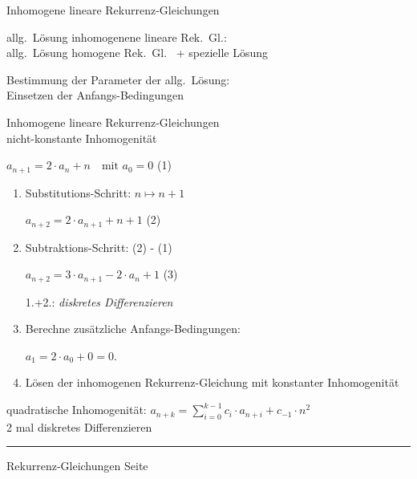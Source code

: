 \documentclass{slides}
\newcounter{mypage}
\begin{document}
\begin{slide}{}
 \begin{center}
  Inhomogene lineare Rekurrenz-Gleichungen 
\end{center}

\footnotesize
allg.~L\"osung inhomogenene lineare Rek.~Gl.: \\[0.3cm]
\hspace*{1.3cm}
allg.~L\"osung homogene Rek.~Gl.~ + spezielle L\"osung

Bestimmung der Parameter der allg.~L\"osung: 
\\[0.3cm]
\hspace*{1.3cm}
Einsetzen der Anfangs-Bedingungen

\normalsize
 \begin{center}
  Inhomogene lineare Rekurrenz-Gleichungen \\
  nicht-konstante Inhomogenit\"at
\end{center}
\footnotesize

\hspace*{1.3cm}
$\displaystyle a_{n+1} = 2 \cdot a_n + n \quad \mbox{mit $a_0 = 0$}$
\hspace*{\fill} (1)
\begin{enumerate}
\item Substitutions-Schritt: $n \mapsto n + 1$

      $\displaystyle a_{n+2} = 2 \cdot a_{n+1} + n + 1$
      \hspace*{\fill} (2)
\item Subtraktions-Schritt: (2) - (1)

      $a_{n+2} = 3 \cdot a_{n+1} - 2 \cdot a_n + 1$ 
      \hspace*{\fill} (3)

      1.+2.: \emph{diskretes Differenzieren}
\item Berechne zus\"atzliche Anfangs-Bedingungen: 

      $a_1 = 2 \cdot a_0 + 0 = 0$.
\item L\"osen der inhomogenen Rekurrenz-Gleichung mit konstanter Inhomogenit\"at
\end{enumerate}
quadratische Inhomogenit\"at: 
$a_{n+k} = \sum\limits_{i=0}^{k-1} c_i \cdot a_{n+i} + c_{-1}\cdot n^2$
\\[0.2cm]
\hspace*{1.3cm}
2 mal diskretes Differenzieren


\vspace*{\fill}
\tiny \addtocounter{mypage}{1}
\rule{17cm}{1mm}
Rekurrenz-Gleichungen  \hspace*{\fill} Seite 
\end{slide}
\end{document}
